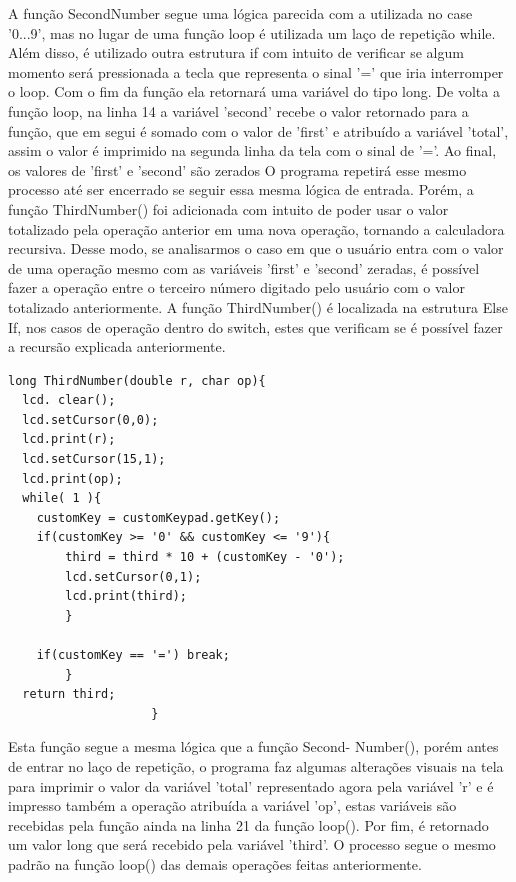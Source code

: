 \documentclass[conference]{IEEEtran}
\begin{document}
        A função SecondNumber segue uma lógica parecida com a
        utilizada no case ’0...9’, mas no lugar de uma função loop é
        utilizada um laço de repetição while. Além disso, é utilizado
        outra estrutura if com intuito de verificar se algum momento
        será pressionada a tecla que representa o sinal ’=’ que iria
        interromper o loop. Com o fim da função ela retornará uma
        variável do tipo long. De volta a função loop, na linha 14
        a variável ’second’ recebe o valor retornado para a função,
        que em segui é somado com o valor de ’first’ e atribuído a
        variável ’total’, assim o valor é imprimido na segunda linha
        da tela com o sinal de ’=’. Ao final, os valores de ’first’ e
        ’second’ são zerados
        O programa repetirá esse mesmo processo até ser encerrado
        se seguir essa mesma lógica de entrada. Porém, a função
        ThirdNumber() foi adicionada com intuito de poder usar o
        valor totalizado pela operação anterior em uma nova operação,
        tornando a calculadora recursiva. Desse modo, se analisarmos 
        o caso em que o usuário entra com o valor de uma
        operação mesmo com as variáveis ’first’ e ’second’ zeradas,
        é possível fazer a operação entre o terceiro número digitado
        pelo usuário com o valor totalizado anteriormente. A função
        ThirdNumber() é localizada na estrutura Else If, nos casos de
        operação dentro do switch, estes que verificam se é possível
        fazer a recursão explicada anteriormente. 
    \begin{lstlisting}
long ThirdNumber(double r, char op){
  lcd. clear();
  lcd.setCursor(0,0);
  lcd.print(r);
  lcd.setCursor(15,1);
  lcd.print(op);
  while( 1 ){
    customKey = customKeypad.getKey();
    if(customKey >= '0' && customKey <= '9'){
        third = third * 10 + (customKey - '0');
        lcd.setCursor(0,1);
        lcd.print(third);
        }
        
    if(customKey == '=') break;
        }
  return third;
					}
    \end{lstlisting}

    Esta função segue a mesma lógica que a função Second-
    Number(), porém antes de entrar no laço de repetição, o
    programa faz algumas alterações visuais na tela para imprimir
    o valor da variável ’total’ representado agora pela variável ’r’
    e é impresso também a operação atribuída a variável ’op’, estas
    variáveis são recebidas pela função ainda na linha 21 da função
    loop(). Por fim, é retornado um valor long
    que será recebido pela variável ’third’. O processo segue o
    mesmo padrão na função loop() das demais operações feitas
    anteriormente.
    
\end{document}
